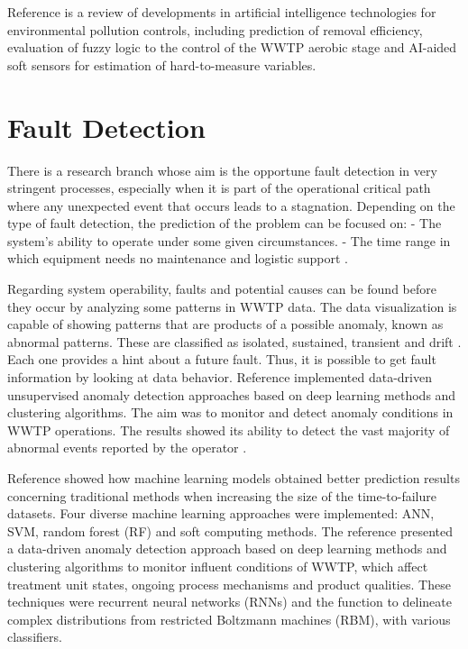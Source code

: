 Reference \cite{Ye2020} is a review of developments in artificial intelligence technologies for environmental pollution controls, including prediction of removal efficiency, evaluation of fuzzy logic to the control of the WWTP aerobic stage and AI-aided soft sensors for estimation of hard-to-measure variables. 

\section{Fault Detection}
\label{s:RelatedWorks-faultDetection}

There is a research branch whose aim is the opportune fault detection in very stringent processes, especially when it is part of the operational critical path where any unexpected event that occurs leads to a stagnation. Depending on the type of fault detection, the prediction of the problem can be focused on:
- The system’s ability to operate under some given circumstances.
- The time range in which equipment needs no maintenance and logistic support \cite{Alsina2018}.

Regarding system operability, faults and potential causes can be found before they occur by analyzing some patterns in \ac{WWTP} data. The data visualization is capable of showing patterns that are products of a possible anomaly, known as abnormal patterns. These are classified as isolated, sustained, transient and drift \cite{Newhart2019}. Each one provides a hint about a future fault. Thus, it is possible to get fault information by looking at data behavior. Reference \cite{Dairi2019} implemented data-driven unsupervised anomaly detection approaches based on deep learning methods and clustering algorithms. The aim was to monitor and detect anomaly conditions in \ac{WWTP} operations. The results showed its ability to detect the vast majority of abnormal events reported by the operator \cite{Dairi2019}. 

 Reference \cite{Alsina2018} showed how machine learning models obtained better prediction results concerning traditional methods when increasing the size of the time-to-failure datasets. Four diverse machine learning approaches were implemented: ANN, SVM, random forest (RF) and soft computing methods. The reference \cite{Dairi2019} presented a data-driven anomaly detection approach based on deep learning methods and clustering algorithms to monitor influent conditions of WWTP, which affect treatment unit states, ongoing process mechanisms and product qualities. These techniques were recurrent neural networks (RNNs) and the function to delineate complex distributions from restricted Boltzmann machines (RBM), with various classifiers.
 
